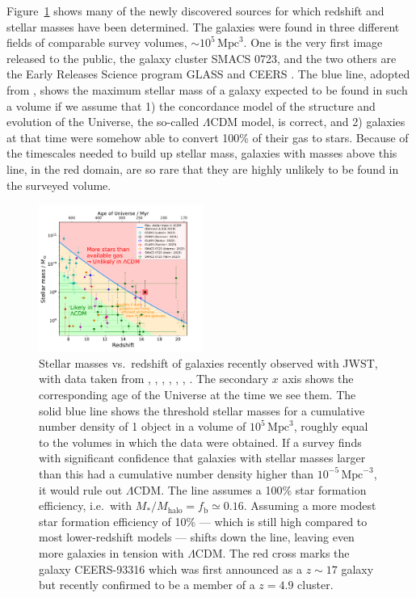 \documentclass[useAMS]{aa}
\begin{document}
Figure~\ref{fig:jwst_stellar_mass_vs_redshift} shows many of the newly discovered sources for which redshift and stellar masses have been determined.
The galaxies were found in three different fields of comparable survey volumes, $\sim10^5\,\mathrm{Mpc}^3$.
One is the very first image released to the public, the galaxy cluster SMACS 0723, and the two others are the Early Releases Science program GLASS \citep{Treu2022} and CEERS \citep{Finkelstein2023}.
The blue line, adopted from \citet{Behroozi2018}, shows the maximum stellar mass of a galaxy expected to be found in such a volume if we assume that
1) the concordance model of the structure and evolution of the Universe, the so-called $\Lambda$CDM model, is correct, and
2) galaxies at that time were somehow able to convert 100\% of their gas to stars.
Because of the timescales needed to build up stellar mass, galaxies with masses above this line, in the red domain, are so rare that they are highly unlikely to be found in the surveyed volume.
\begin{figure}[!t]
    \centering
    \includegraphics [width=0.48\textwidth] {jwst-stellar-mass-vs-redshift.pdf}
    \caption{Stellar masses vs.~redshift of galaxies recently observed with JWST, with data taken from
    \citet{Labbe2023},
    \citet{Donnan2023},
    \citet{Naidu2022},
    \citet{Santini2023},
    \citet{Adams2023},
    \citet{Atek2023},
    \citet{Yan2023}.
    The secondary $x$ axis shows the corresponding age of the Universe at the time we see them.
    The solid blue line shows the threshold stellar masses for a cumulative number density of 1 object in a volume of $10^5\,\mathrm{Mpc}^3$, roughly equal to the volumes in which the data were obtained.
    If a survey finds with significant confidence that galaxies with stellar masses larger than this had a cumulative number density higher than $10^{-5}\,\mathrm{Mpc}^{-3}$, it would rule out $\Lambda$CDM.
    The line assumes a 100\% star formation efficiency, i.e.~with $M_*/M_\mathrm{halo} = f_\mathrm{b} \simeq 0.16$.
    Assuming a more modest star formation efficiency of 10\% --- which is still high compared to most lower-redshift models --- shifts down the line, leaving even more galaxies in tension with $\Lambda$CDM.
    The red cross marks the galaxy CEERS-93316 which was first announced as a $z\sim17$ galaxy but recently confirmed to be a member of a $z=4.9$ cluster.}
    \label{fig:jwst_stellar_mass_vs_redshift}
\end{figure}
\end{document}

